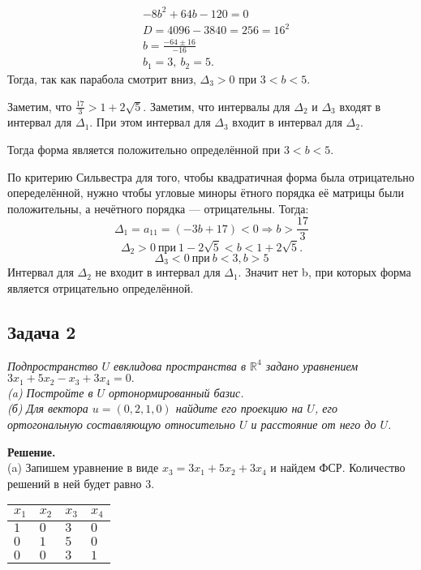	\begin{align*}
	&-8b^2 + 64b - 120 = 0 \\
	&D = 4096 - 3840 = 256 = 16^2 \\ 
	&b = \frac{-64 \pm 16}{-16} \\
	&b_1 = 3,\ b_2 = 5.
	\end{align*}
	Тогда, так как парабола смотрит вниз, $\Delta_3 > 0$ при $3 < b < 5$.
	
	Заметим, что $\frac{17}{3} > 1 + 2\sqrt{5}$. 
	Заметим, что интервалы для $\Delta_2$ и $\Delta_3$ входят в интервал для $\Delta_1$. При этом интервал для $\Delta_3$ входит в интервал для $\Delta_2$.
	
	Тогда форма является положительно определённой при $3 < b < 5$.

	По критерию Сильвестра для того, чтобы квадратичная форма была отрицательно опеределённой, нужно чтобы угловые миноры ётного порядка её матрицы были положительны, а нечётного порядка — отрицательны. Тогда:
	\[
		\Delta_1 = a_{11} = (-3b + 17) < 0 \Rightarrow b > \frac{17}{3}
	\]	
	\[
		\Delta_2 > 0\ при\ 1 - 2\sqrt{5} < b < 1 + 2\sqrt{5}.
	\]	
	\[
		\Delta_3 < 0\ при\ b < 3, b > 5
	\]
	Интервал для $\Delta_2$ не входит в интервал для $\Delta_1$.
	Значит нет b, при которых форма является отрицательно определённой.
	
	\subsection{Задача 2} 
	\textit{Подпространство $U$ евклидова пространства в $\mathbb{R}^4$ задано уравнением $3x_1 + 5x_2 - x_3 + 3x_4 = 0.$\\
	(a) Постройте в $U$ ортонормированный базис.\\
	(б) Для вектора $u = (0,2,1,0)$ найдите его проекцию на $U$, его ортогональную составляющую относительно $U$ и расстояние от него до $U$.}

	\textbf{Решение.}\\
	(a) Запишем уравнение в виде $x_3 = 3x_1 + 5x_2 + 3x_4$ и найдем ФСР. Количество решений в ней будет равно 3. \\
	\begin{tabular}[t]{|l|l|l|l|}
		\hline
		$x_1$	& $x_2$ & $x_3$ & $x_4$\\
		\hline
		$1$	& $0$ & $3$ & $0$\\
		\hline
		$0$	& $1$ & $5$ & $0$\\
		\hline
		$0$	& $0$ & $3$ & $1$\\
		\hline
	\end{tabular}
	
